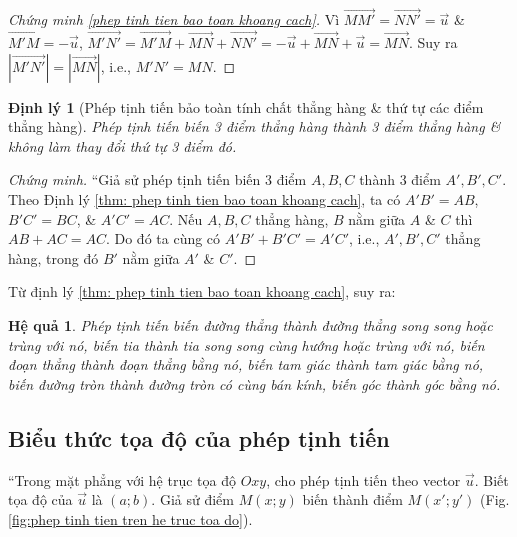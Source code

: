 \documentclass[oneside]{book}
\numberwithin{equation}{section}
\newtheorem{hequa}{Hệ quả}[section]
\newtheorem{dinhly}{Định lý}[section]
\begin{document}
\begin{proof}[Chứng minh \eqref{phep tinh tien bao toan khoang cach}]
	Vì $\overrightarrow{MM'} = \overrightarrow{NN'} = \vec{u}$ \& $\overrightarrow{M'M} = -\vec{u}$, $\overrightarrow{M'N'} = \overrightarrow{M'M} + \overrightarrow{MN} + \overrightarrow{NN'} = -\vec{u} + \overrightarrow{MN} + \vec{u} = \overrightarrow{MN}$. Suy ra $|\overrightarrow{M'N'}| = |\overrightarrow{MN}|$, i.e., $M'N' = MN$.
\end{proof}

\begin{dinhly}[Phép tịnh tiến bảo toàn tính chất thẳng hàng \& thứ tự các điểm thẳng hàng]
	Phép tịnh tiến biến 3 điểm thẳng hàng thành 3 điểm thẳng hàng \& không làm thay đổi thứ tự 3 điểm đó.
\end{dinhly}

\begin{proof}[Chứng minh]
	``Giả sử phép tịnh tiến biến 3 điểm $A,B,C$ thành 3 điểm $A',B',C'$. Theo Định lý \ref{thm: phep tinh tien bao toan khoang cach}, ta có $A'B' = AB$, $B'C' = BC$, \& $A'C' = AC$. Nếu $A,B,C$ thẳng hàng, $B$ nằm giữa $A$ \& $C$ thì $AB + AC = AC$. Do đó ta cùng có $A'B' + B'C' = A'C'$, i.e., $A',B',C'$ thẳng hàng, trong đó $B'$ nằm giữa $A'$ \& $C'$.
\end{proof}
Từ định lý \ref{thm: phep tinh tien bao toan khoang cach}, suy ra:

\begin{hequa}
	\label{cor:phep tinh tien}
	Phép tịnh tiến biến đường thẳng thành đường thẳng song song hoặc trùng với nó, biến tia thành tia song song cùng hướng hoặc trùng với nó, biến đoạn thẳng thành đoạn thẳng bằng nó, biến tam giác thành tam giác bằng nó, biến đường tròn thành đường tròn có cùng bán kính, biến góc thành góc bằng nó.
\end{hequa}

\subsection{Biểu thức tọa độ của phép tịnh tiến}
``Trong mặt phẳng với hệ trục tọa độ $Oxy$, cho phép tịnh tiến theo vector $\vec{u}$. Biết tọa độ của $\vec{u}$ là $(a;b)$. Giả sử điểm $M(x;y)$ biến thành điểm $M(x';y')$ (Fig. \ref{fig:phep tinh tien tren he truc toa do}).
\end{document}
